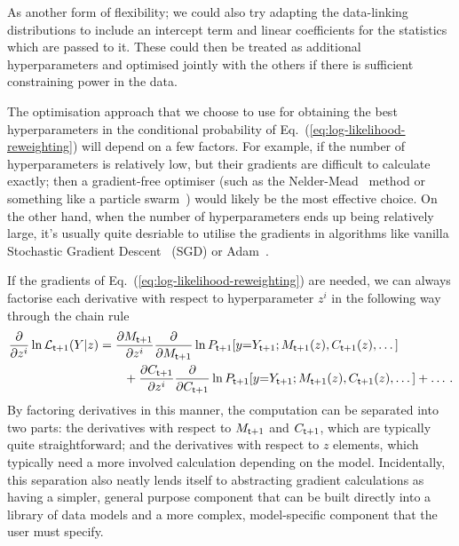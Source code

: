 As another form of flexibility; we could also try adapting the data-linking distributions to include an intercept term and linear coefficients for the statistics which are passed to it. These could then be treated as additional hyperparameters and optimised jointly with the others if there is sufficient constraining power in the data.

The optimisation approach that we choose to use for obtaining the best hyperparameters in the conditional probability of Eq.~(\ref{eq:log-likelihood-reweighting}) will depend on a few factors. For example, if the number of hyperparameters is relatively low, but their gradients are difficult to calculate exactly; then a gradient-free optimiser (such as the Nelder-Mead~\cite{nelder1965simplex} method or something like a particle swarm~\cite{kennedy1995particle, shi1998modified}) would likely be the most effective choice. On the other hand, when the number of hyperparameters ends up being relatively large, it's usually quite desriable to utilise the gradients in algorithms like vanilla Stochastic Gradient Descent~\cite{robbins1951stochastic} (SGD) or Adam~\cite{kingma2014adam}.

If the gradients of Eq.~(\ref{eq:log-likelihood-reweighting}) are needed, we can always factorise each derivative with respect to hyperparameter $z^i$ in the following way through the chain rule
\begin{align}
\frac{\partial}{\partial z^i}\ln {\cal L}_{{\sf t}+1}(Y \vert z) &= \frac{\partial M_{{\sf t}+1}}{\partial z^i}\frac{\partial}{\partial M_{{\sf t}+1}}\ln P_{{\sf t}+1}[y{=}Y_{{\sf t}+1};M_{{\sf t}+1}(z),C_{{\sf t}+1}(z),\dots ] \nonumber \\ 
&\qquad + \frac{\partial C_{{\sf t}+1}}{\partial z^i}\frac{\partial }{\partial C_{{\sf t}+1}}\ln P_{{\sf t}+1}[y{=}Y_{{\sf t}+1};M_{{\sf t}+1}(z),C_{{\sf t}+1}(z),\dots ] + \dots  \,. \label{eq:log-likelihood-reweighting-grad}
\end{align}
By factoring derivatives in this manner, the computation can be separated into two parts: the derivatives with respect to $M_{{\sf t}+1}$ and $C_{{\sf t}+1}$, which are typically quite straightforward; and the derivatives with respect to $z$ elements, which typically need a more involved calculation depending on the model. Incidentally, this separation also neatly lends itself to abstracting gradient calculations as having a simpler, general purpose component that can be built directly into a library of data models and a more complex, model-specific component that the user must specify.


